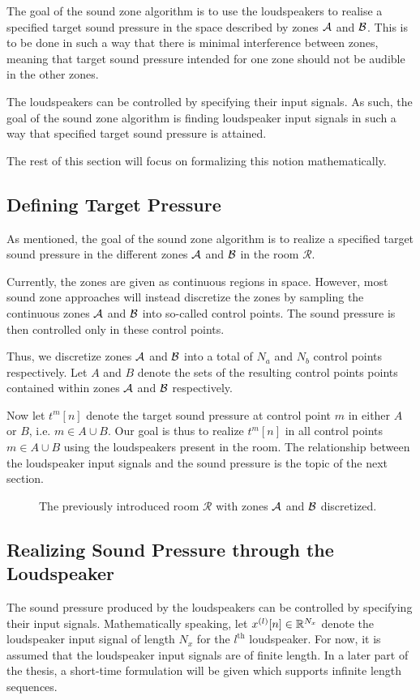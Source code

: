 The goal of the sound zone algorithm is to use the loudspeakers to realise a specified target sound pressure
in the space described by zones $\mathcal{A}$ and $\mathcal{B}$.
This is to be done in such a way that there is minimal interference between zones, 
meaning that target sound pressure intended for one zone should not be audible in the other zones.

The loudspeakers can be controlled by specifying their input signals.
As such, the goal of the sound zone algorithm is finding loudspeaker input signals in such a way that 
specified target sound pressure is attained.

The rest of this section will focus on formalizing this notion mathematically.

\subsection{Defining Target Pressure}
\label{ch:sound_zone:data_model:target_pressure}
As mentioned, the goal of the sound zone algorithm is to realize a specified target sound pressure
in the different zones $\mathcal{A}$ and $\mathcal{B}$ in the room $\mathcal{R}$.

Currently, the zones are given as continuous regions in space.
However, most sound zone approaches will instead discretize the zones by sampling the continuous zones 
$\mathcal{A}$ and $\mathcal{B}$ into so-called control points.
The sound pressure is then controlled only in these control points.

Thus, we discretize zones $\mathcal{A}$ and $\mathcal{B}$ into a total of $N_a$ and $N_b$ control points respectively.   
Let $A$ and $B$ denote the sets of the resulting control points points contained within zones $\mathcal{A}$ and $\mathcal{B}$ respectively.

Now let $t^{m}[n]$ denote the target sound pressure at control point $m$ in either $A$ or $B$, i.e. $m\in A \cup B$.
Our goal is thus to realize $t^{m}[n]$ in all control points $m\in A \cup B$ using the loudspeakers present in the room.
The relationship between the loudspeaker input signals and the sound pressure is the topic of the next section.

\begin{figure}
    \centering
    
    \caption{The previously introduced room $\mathcal{R}$ with zones $\mathcal{A}$ and $\mathcal{B}$ discretized.}
\end{figure}

\subsection{Realizing Sound Pressure through the Loudspeaker}
\label{ch:sound_zone:data_model:realizing_pressure}
The sound pressure produced by the loudspeakers can be controlled by specifying their input signals.
Mathematically speaking, let $x^{(l)}[n]\in\mathbb{R}^{N_x}$ denote the loudspeaker input signal of length $N_x$ for the $l^\text{th}$ loudspeaker.
For now, it is assumed that the loudspeaker input signals are of finite length. 
In a later part of the thesis, a short-time formulation will be given which supports infinite length sequences. 

